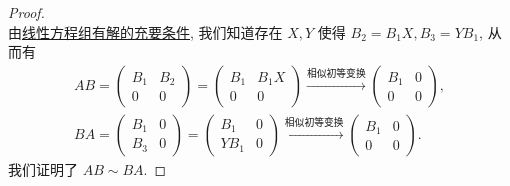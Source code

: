 \documentclass[../../main.tex]{subfiles}%
\begin{document}
\begin{proof}
\[\]
由\hyperref[theorem:线性方程组有解的充要条件]{线性方程组有解的充要条件}, 我们知道存在 \( X,Y \) 使得 \( B_2 = B_1X, B_3 = YB_1 \), 从而有
\begin{gather*}
AB = \begin{pmatrix} B_1 & B_2 \\ 0 & 0 \end{pmatrix} = \begin{pmatrix} B_1 & B_1X \\ 0 & 0 \end{pmatrix} \xrightarrow{\hyperref[proposition:相似初等变换]{\text{相似初等变换}}} \begin{pmatrix} B_1 & 0 \\ 0 & 0 \end{pmatrix},
\\
BA = \begin{pmatrix} B_1 & 0 \\ B_3 & 0 \end{pmatrix} = \begin{pmatrix} B_1 & 0 \\ YB_1 & 0 \end{pmatrix} \xrightarrow{\hyperref[proposition:相似初等变换]{\text{相似初等变换}}} \begin{pmatrix} B_1 & 0 \\ 0 & 0 \end{pmatrix}.
\end{gather*}
我们证明了 \( AB \sim BA \).

\end{proof}
\end{document}
